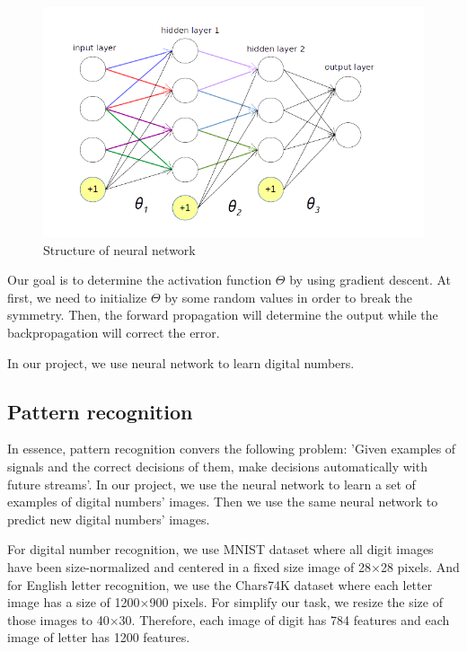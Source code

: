 \documentclass[paper=a4, french, 11pt]{scrartcl}
\begin{document}
\begin{figure}[h]
\begin{center}
	\vspace{-1ex}
   \includegraphics[width=0.75\linewidth]{network.png}
\end{center}
\vspace{-4ex}
\caption{Structure of neural network}
\label{fig:heatmap}
\end{figure}

Our goal is to determine the activation function $\Theta$ by using gradient descent. At first, we need to initialize $\Theta$ by some random values in order to break the symmetry. Then, the forward propagation will determine the output while the backpropagation will correct the error.

In our project, we use neural network to learn digital numbers.

\subsection{Pattern recognition}

In essence, pattern recognition convers the following problem: 'Given examples of signals and the correct decisions of them, make decisions automatically with future streams'. In our project, we use the neural network to learn a set of examples of digital numbers' images. Then we use the same neural network to predict new digital numbers' images. 

For digital number recognition, we use MNIST dataset \cite{lecun1998gradient} where all digit images have been size-normalized and centered in a fixed size image of 28$\times$28 pixels. And for English letter recognition, we use the Chars74K dataset \cite{de2009character} where each letter image has a size of 1200$\times$900 pixels. For simplify our task, we resize the size of those images to 40$\times$30. Therefore, each image of digit has 784 features and each image of letter has 1200 features.
\end{document}
